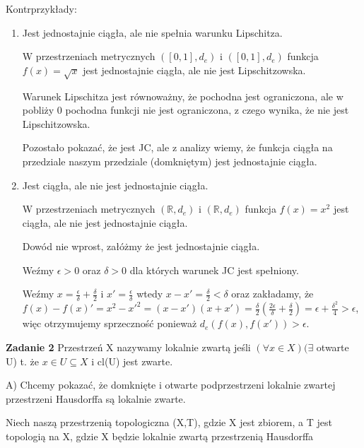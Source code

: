 \documentclass[12pt,a4paper]{article}
\def\R{\mathbb{R}}
\newcommand{\zadanie}[1]{\par\textbf{Zadanie #1}}
\begin{document}
Kontrprzykłady:
\begin{enumerate}
    \item Jest jednostajnie ciągła, ale nie spełnia warunku Lipschitza.
    
    W przestrzeniach metrycznych $([0,1], d_e)$ i $([0,1], d_e)$ funkcja $f(x) = \sqrt{x}$ jest jednostajnie ciągła, ale nie jest Lipschitzowska.
    
    Warunek Lipschitza jest równoważny, że pochodna jest ograniczona, ale w pobliży 0 pochodna funkcji nie jest ograniczona, z czego wynika, że nie jest Lipschitzowska.
    
    Pozostało pokazać, że jest JC, ale z analizy wiemy, że funkcja ciągła na przedziale naszym przedziale (domkniętym) jest jednostajnie ciągła.
    
    \item Jest ciągła, ale nie jest jednostajnie ciągła.
    
    W przestrzeniach metrycznych $(\R, d_e)$ i $(\R, d_e)$ funkcja $f(x) = x^2$ jest ciągła, ale nie jest jednostajnie ciągła.
    
    Dowód nie wprost, załóżmy że jest jednostajnie ciągła.
    
    Weźmy $\epsilon > 0$ oraz $\delta > 0$ dla których warunek JC jest spełniony.
    
    Weźmy $x = \frac{\epsilon}{\delta} + \frac{\delta}{2}$ i $x' = \frac{\epsilon}{\delta}$ wtedy $x - x' = \frac{\delta}{2} < \delta$ oraz zakładamy, że $f(x) - f(x)' = x^2 - x'^2 = (x-x')(x+x') = \frac{\delta}{2}(\frac{2\epsilon}{\delta} + \frac{\delta}{2}) = \epsilon + \frac{\delta^2}{4} > \epsilon$, więc otrzymujemy sprzeczność ponieważ $d_e(f(x), f(x')) > \epsilon$.
    
    
\end{enumerate}
\zadanie{2}
Przestrzeń X nazywamy lokalnie zwartą jeśli $(\forall x \in X) (\exists$ otwarte U) t. że $x \in U \subseteq X$ i cl(U) jest zwarte. 

A) Chcemy pokazać, że domknięte i otwarte podprzestrzeni lokalnie zwartej przestrzeni Hausdorffa są lokalnie zwarte.

Niech naszą przestrzenią topologiczna (X,T), gdzie X jest zbiorem, a T jest topologią na X, gdzie X będzie lokalnie zwartą przestrzenią Hausdorffa
\end{document}
